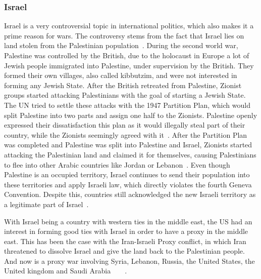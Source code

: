 \subsubsection{Israel} %
Israel is a very controversial topic in international politics, which also makes it a prime reason for wars. The controversy stems from the fact that Israel lies on land stolen from the Palestinian population~\autocite{aljazeera-israel-illegal-settlement}.
During the second world war, Palestine was controlled by the British, due to the holocaust in Europe a lot of Jewish people immigrated into Palestine, under supervision by the British. They formed their own villages, also called kibbutzim, and were not interested in forming any Jewish State. After the British retreated from Palestine, Zionist groups started attacking Palestinians with the goal of starting a Jewish State. The UN tried to settle these attacks with the 1947 Partition Plan, which would split Palestine into two parts and assign one half to the Zionists. Palestine openly expressed their dissatisfaction this plan as it would illegally steal part of their country, while the Zionists seemingly agreed with it~\autocite{aljazeera-israel-illegal-settlement}.
After the Partition Plan was completed and Palestine was split into Palestine and Israel, Zionists started attacking the Palestinian land and claimed it for themselves, causing Palestinians to flee into other Arabic countries like Jordan or Lebanon~\autocite{aljazeera-israel-illegal-settlement}. 
Even though Palestine is an occupied territory, Israel continues to send their population into these territories and apply Israeli law, which directly violates the fourth Geneva Convention. Despite this, countries still acknowledged the new Israeli territory as a legitimate part of Israel~\autocite{aljazeera-israel-illegal-settlement}.

With Israel being a country with western ties in the middle east, the US had an interest in forming good ties with Israel in order to have a proxy in the middle east. This has been the case with the Iran-Israeli Proxy conflict, in which Iran threatened to dissolve Israel and give the land back to the Palestinian people. And now is a proxy war involving Syria, Lebanon, Russia, the United States, the United kingdom and Saudi Arabia~\autocite{aljazeera-israel-iran-shadow}~\autocite{smh-shadow-war-israel-iran}~\autocite{lemonde-shadow-war-israel-iran}~\autocite{time-shadow-war-israel-iran}.